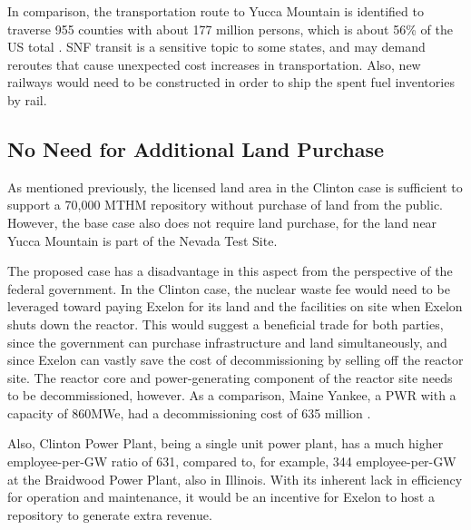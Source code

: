 In comparison, the 
transportation route to Yucca Mountain is identified to traverse 955 counties
with about 177 million persons, which is about 56\% of the US total
 \cite{halstead_yucca_2011}. \gls{SNF} transit is a sensitive topic to some states, and may
 demand reroutes that cause unexpected cost increases in transportation. Also,
 new railways would need to be constructed in order to ship the spent fuel inventories
 by rail. 

\subsection{No Need for Additional Land Purchase}



  
  As mentioned previously, the licensed land area in the Clinton case is 
  sufficient to support a 70,000 MTHM repository without purchase of land from 
  the public.  However, the base case also does not require land purchase, for the land near 
  Yucca Mountain is part of the Nevada Test Site. 
  
  The proposed case has a disadvantage in this aspect from the perspective of 
  the federal government. In the Clinton case, the nuclear waste fee would need 
  to be leveraged toward paying Exelon for its land and the facilities on site 
  when Exelon shuts down the reactor.
  This would suggest a beneficial trade for both parties, since the government
  can purchase infrastructure and land simultaneously, and since Exelon can vastly
  save the cost of decommissioning by selling off the reactor site. The reactor
  core and power-generating component of the reactor site needs to be decommissioned,
  however. As a comparison, Maine Yankee, a PWR with a capacity of 860MWe, had a
  decommissioning cost of 635 million \cite{aker_maine_2004}.


Also, Clinton Power Plant, being a single unit power plant, has a much higher
 employee-per-GW ratio of 631, compared to, for example, 344 employee-per-GW at
the Braidwood Power Plant, also in Illinois. %
With its inherent lack in efficiency for operation and maintenance, it would be
an incentive for Exelon to host a repository to generate extra revenue. 

